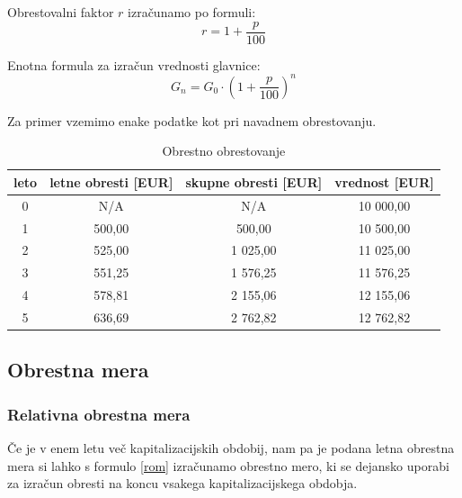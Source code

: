 \documentclass[12pt]{article}
\begin{document}
        Obrestovalni faktor $r$ izračunamo po formuli:
        \begin{equation}
            r = 1 + \frac{p}{100}
        \end{equation}
        
        Enotna formula za izračun vrednosti glavnice:
        \begin{equation}
            G_n = G_0 \cdot (1 + \frac{p}{100})^n
        \end{equation}

        \newpage
        Za primer vzemimo enake podatke kot pri navadnem obrestovanju.
        \begin{center}
            \begin{table}[h!]
                \centering
                \begin{tabular}{|c|c|c|c|}
                    \hline
                    \textbf{leto} & \textbf{letne obresti [EUR]} & \textbf{skupne obresti [EUR]} & \textbf{vrednost [EUR]} \\ \hline
                    0 & N/A & N/A & 10 000,00 \\ \hline
                    1 & 500,00 & 500,00 & 10 500,00 \\ \hline
                    2 & 525,00 & 1 025,00 & 11 025,00 \\ \hline
                    3 & 551,25 & 1 576,25 & 11 576,25 \\ \hline
                    4 & 578,81 & 2 155,06 & 12 155,06 \\ \hline
                    5 & 636,69 & 2 762,82 & 12 762,82 \\ \hline
                \end{tabular}
                \caption{Obrestno obrestovanje}
            \end{table}
        \end{center}

    \subsection{Obrestna mera}
        \subsubsection{Relativna obrestna mera}
        Če je v enem letu več kapitalizacijskih obdobij, nam pa je podana letna obrestna 
        mera si lahko s formulo \eqref{rom} izračunamo obrestno mero, ki se dejansko 
        uporabi za izračun obresti na koncu vsakega kapitalizacijskega obdobja.
\end{document}
